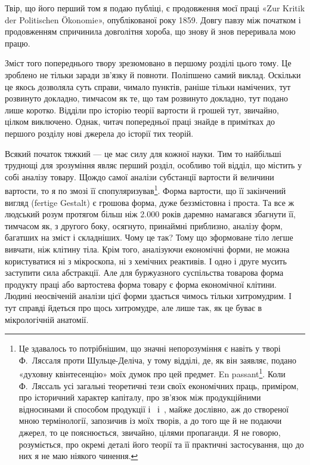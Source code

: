 

Твір, що його перший том я подаю публіці, є продовження
моєї праці «Zur Kritik der Politischen Ökonomie», опублікованої
року 1859. Довгу павзу між початком і продовженням спричинила
довголітня хороба, що знову й знов переривала мою працю.

Зміст того попереднього твору зрезюмовано в першому розділі
цього тому. Це зроблено не тільки заради зв’язку й повноти. Поліпшено
самий виклад. Оскільки це якось дозволяла суть справи,
чимало пунктів, раніше тільки намічених, тут розвинуто докладно,
тимчасом як те, що там розвинуто докладно, тут подано лише
коротко. Відділи про історію теорії вартости й грошей тут,
звичайно, цілком виключено. Однак, читач попередньої праці
знайде в примітках до першого розділу нові джерела до історії
тих теорій.

Всякий початок тяжкий — це має силу для кожної науки.
Тим то найбільші труднощі для зрозуміння являє перший розділ,
особливо той відділ, що містить у собі аналізу товару. Щождо
самої аналізи субстанції вартости й величини вартости, то я по
змозі її спопуляризував\footnote{
Це здавалось то потрібнішим, що значні непорозуміння є навіть
у творі Ф.~Ляссаля проти Шульце-Деліча, у тому відділі, де, як він
заявляє, подано «духовну квінтесенцію» моїх думок про цей предмет.
En passant\footnote*{
між іншим. \emph{Ред.}
}. Коли Ф.~Ляссаль усі загальні теоретичні тези своїх економічних
праць, приміром, про історичний характер капіталу, про зв’язок
між продукційними відносинами й способом продукції і~ і~,
майже дослівно, аж до створеної мною термінології, запозичив із моїх
творів, а до того ще й не подаючи джерел, то це пояснюється, звичайно,
цілями пропаганди. Я не говорю, розуміється, про окремі деталі його
теорії та її практичні застосування, що до них я не маю ніякого чинення.
}. Форма вартости, що її закінчений
вигляд (fertige Gestalt) є грошова форма, дуже беззмістовна і
проста. Та все ж людський розум протягом більш ніж \num{2.000} років
даремно намагався збагнути її, тимчасом як, з другого боку, осягнуто,
принаймні приблизно, аналізу форм, багатших на зміст і
складніших. Чому це так? Тому що зформоване тіло легше вивчати,
ніж клітину тіла. Крім того, аналізуючи економічні
форми, не можна користуватися ні з мікроскопа, ні з хемічних
реактивів. І одно і друге мусить заступити сила абстракції. Але
для буржуазного суспільства товарова форма продукту праці або
вартостева форма товару є форма економічної клітини. Людині
неосвіченій аналізи цієї форми здається чимось тільки хитромудрим.
І тут справді йдеться про щось хитромудре, але лише
так, як це буває в мікрологічній анатомії.
